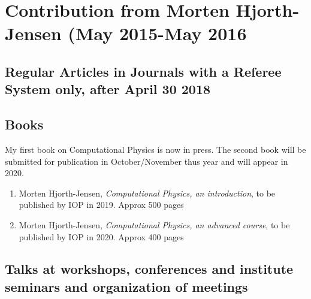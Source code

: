 \documentclass[prc,amsart,english,twocolumn,superscriptaddress,showpacs,floatfix]{revtex4}
\begin{document}
 \section*{Contribution from Morten Hjorth-Jensen (May 2015-May 2016}

 \subsection*{Regular Articles in Journals with a Referee System only, after April 30 2018}
\begin{enumerate}

 \end{enumerate}


 \subsection*{Books}
My first book on Computational Physics is now in press. The second book will be submitted for publication in October/November thus year and will appear in 2020.
\begin{enumerate}
\item Morten Hjorth-Jensen, \emph{Computational Physics, an introduction}, to be published by IOP in 2019. Approx 500 pages

\item Morten Hjorth-Jensen, \emph{Computational Physics, an advanced course}, to be published by IOP in 2020. Approx 400 pages

\end{enumerate}



 \subsection*{Talks at workshops, conferences and institute seminars and organization of meetings}
\begin{enumerate}


\end{enumerate}
\end{document}
